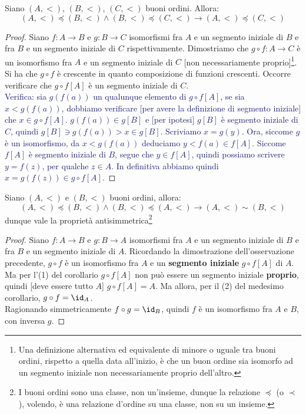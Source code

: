 \documentclass[11pt]{scrartcl}
\begin{document}
\begin{remark}
	Siano $(A,<)$, $(B,<)$, $(C,<)$ buoni ordini. Allora:
	\[ (A,<) \preceq (B,<) \land (B,<) \preceq (C,<) \rightarrow (A,<) \preceq (C,<)
		\]
\end{remark}

\begin{proof}
	Siano $f : A \rightarrow B$ e $g : B \rightarrow C$ isomorfismi fra $A$ e un segmento iniziale di $B$ e fra $B$ e un segmento iniziale di $C$ rispettivamente.
	Dimostriamo che $g \circ f : A \rightarrow C$ è un isomorfismo fra $A$ e un segmento iniziale di $C$ [non necessariamente proprio]\footnote{Una definizione alternativa ed equivalente di minore o uguale tra buoni ordini, rispetto a quella data all'inizio, è 
	che un buon ordine sia isomorfo ad un segmento iniziale non necessariamente proprio dell'altro.}. Si ha che $g \circ f$ è crescente in quanto composizione di funzioni crescenti.
	Occorre verificare che $g \circ f[A]$ è un segmento iniziale di $C$.\\
	\textcolor{MidnightBlue}{Verifica: sia $g(f(a))$ un qualunque elemento di $g \circ f[A]$, se sia $x < g(f(a))$, dobbiamo verificare [per avere la definizione di segmento iniziale] che $x \in g \circ f[A]$.
	$g(f(a)) \in g[B]$ e [per ipotesi] $g[B]$ è segmento iniziale di $C$, quindi $g[B] \ni g(f(a)) > x \in g[B]$. Scriviamo $x = g(y)$. Ora, siccome $g$ è un isomorfismo, da $x < g(f(a))$ deduciamo $y < f(a) \in f[A]$.
	Siccome $f[A]$ è segmento iniziale di $B$, segue che $y \in f[A]$, quindi possiamo scrivere $y = f(z)$, per qualche $z \in A$. In definitiva abbiamo quindi $x = g(f(z)) \in g \circ f[A]$.}
\end{proof}

\begin{remark}
	Siano $(A,<)$ e $(B,<)$ buoni ordini, allora:
	\[ (A,<) \preceq (B,<) \land (B,<) \preceq (A,<) \rightarrow (A,<) \sim (B,<)
		\]
	dunque vale la proprietà antisimmetrica\footnote{I buoni ordini sono una classe, non un'insieme, dunque la relazione $\preceq$ (o $\prec$), volendo, è una relazione d'ordine su una classe, non su un insieme.}
\end{remark}

\begin{proof}
	Siano $f : A \rightarrow B$ e $g : B \rightarrow A$ isomorfismi fra $A$ e un segmento iniziale di $B$ e fra $B$ e un segmento iniziale di $A$.
	Ricordando la dimostrazione dell'osservazione precedente, $g \circ f$ è un isomorfismo fra $A$ e un \textbf{segmento iniziale} $g \circ f[A]$ di $A$. Ma per l'(1) del corollario 
	$g \circ f[A]$ non può essere un segmento iniziale \textbf{proprio}, quindi [deve essere tutto $A$] $g \circ f[A] = A$. Ma allora, per il (2) del medesimo corollario, $g \circ f = \id_A$.\\
	Ragionando simmetricamente $f \circ g = \id_B$, quindi $f$ è un isomorfismo fra $A$ e $B$, con inversa $g$.
\end{proof}
\end{document}

